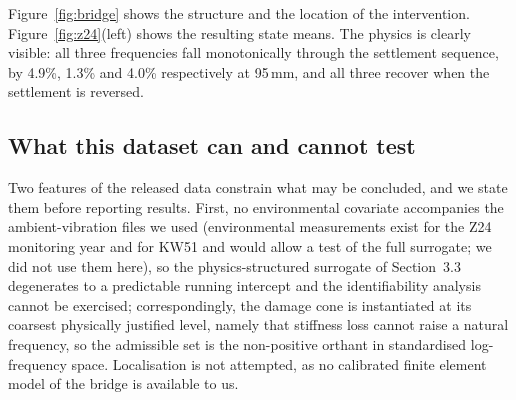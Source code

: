 \documentclass[12pt,a4paper]{article}
\newcommand{\rev}[1]{#1}
\newcommand{\rev}[1]{{\color{revcol}#1}}
\begin{document}
Figure~\ref{fig:bridge} shows the structure and the location of the intervention. Figure~\ref{fig:z24}(left) shows the resulting state means. The physics is clearly visible: all three frequencies fall monotonically through the settlement sequence, by 4.9\%, 1.3\% and 4.0\% respectively at 95\,mm, and all three recover when the settlement is reversed.

\subsection{What this dataset can and cannot test}\label{sec:z24-scope}

Two features of the released data constrain what may be concluded, and we state them before reporting results. First, no environmental covariate accompanies the ambient-vibration files \rev{we used (environmental measurements exist for the Z24 monitoring year and for KW51 and would allow a test of the full surrogate; we did not use them here)}, so the physics-structured surrogate of Section~3.3 degenerates to a predictable running intercept and the identifiability analysis cannot be exercised; correspondingly, the damage cone is instantiated at its coarsest physically justified level, namely that stiffness loss cannot raise a natural frequency, so the admissible set is the non-positive orthant in standardised log-frequency space. Localisation is not attempted, as no calibrated finite element model of the bridge is available to us.
\end{document}
